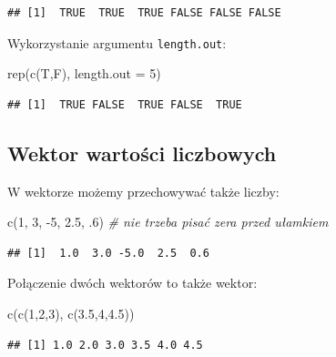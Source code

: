 \documentclass[
]{book}
\newenvironment{Shaded}{\begin{snugshade}}{\end{snugshade}}
\newcommand{\AttributeTok}[1]{\textcolor[rgb]{0.77,0.63,0.00}{#1}}
\newcommand{\CommentTok}[1]{\textcolor[rgb]{0.56,0.35,0.01}{\textit{#1}}}
\newcommand{\DecValTok}[1]{\textcolor[rgb]{0.00,0.00,0.81}{#1}}
\newcommand{\FloatTok}[1]{\textcolor[rgb]{0.00,0.00,0.81}{#1}}
\newcommand{\FunctionTok}[1]{\textcolor[rgb]{0.00,0.00,0.00}{#1}}
\newcommand{\NormalTok}[1]{#1}
\newcommand{\SpecialCharTok}[1]{\textcolor[rgb]{0.00,0.00,0.00}{#1}}
\begin{document}
\begin{verbatim}
## [1]  TRUE  TRUE  TRUE FALSE FALSE FALSE
\end{verbatim}

Wykorzystanie argumentu \texttt{length.out}:

\begin{Shaded}
\begin{Highlighting}[]
\FunctionTok{rep}\NormalTok{(}\FunctionTok{c}\NormalTok{(T,F), }\AttributeTok{length.out =} \DecValTok{5}\NormalTok{)}
\end{Highlighting}
\end{Shaded}

\begin{verbatim}
## [1]  TRUE FALSE  TRUE FALSE  TRUE
\end{verbatim}

\hypertarget{wektor-wartoux15bci-liczbowych}{%
\subsection{Wektor wartości liczbowych}\label{wektor-wartoux15bci-liczbowych}}

W wektorze możemy przechowywać także liczby:

\begin{Shaded}
\begin{Highlighting}[]
\FunctionTok{c}\NormalTok{(}\DecValTok{1}\NormalTok{, }\DecValTok{3}\NormalTok{, }\SpecialCharTok{{-}}\DecValTok{5}\NormalTok{, }\FloatTok{2.5}\NormalTok{, .}\DecValTok{6}\NormalTok{) }\CommentTok{\# nie trzeba pisać zera przed ułamkiem}
\end{Highlighting}
\end{Shaded}

\begin{verbatim}
## [1]  1.0  3.0 -5.0  2.5  0.6
\end{verbatim}

Połączenie dwóch wektorów to także wektor:

\begin{Shaded}
\begin{Highlighting}[]
\FunctionTok{c}\NormalTok{(}\FunctionTok{c}\NormalTok{(}\DecValTok{1}\NormalTok{,}\DecValTok{2}\NormalTok{,}\DecValTok{3}\NormalTok{), }\FunctionTok{c}\NormalTok{(}\FloatTok{3.5}\NormalTok{,}\DecValTok{4}\NormalTok{,}\FloatTok{4.5}\NormalTok{))}
\end{Highlighting}
\end{Shaded}

\begin{verbatim}
## [1] 1.0 2.0 3.0 3.5 4.0 4.5
\end{verbatim}
\end{document}
